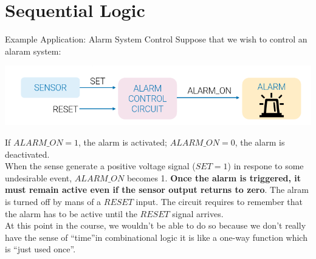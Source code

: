     \section{Sequential Logic}
    \begin{parag}{Example Application: Alarm System Control}
        Suppose that we wish to control an alaram system:
        \begin{center}
            \includegraphics[scale=0.5]{12025-03-31.png}
        \end{center}
        If $ALARM\_ON = 1$, the alarm is activated; $ALARM\_ON = 0$, the alarm is deactivated.\\
        When the sense generate a positive voltage signal ($SET = 1$) in respone to some undesirable event, $ALARM\_ON$ becomes 1. \textbf{Once the alarm is triggered, it must remain active even if the sensor output returns to zero}. The alram is turned off by mans of a $RESET$ input. The circuit requires  to remember that the alarm has to be active until the $RESET$ signal arrives.\\
        At this point in the course, we wouldn't be able to do so because we don't really have the sense of ``time''in combinational logic it is like a one-way function which is ``just used once''.
    \end{parag}
